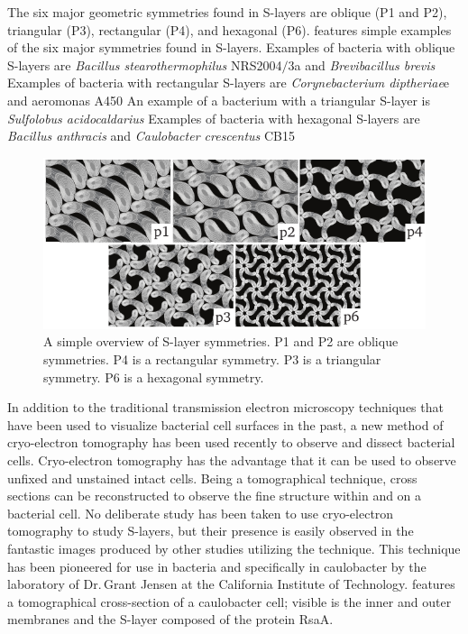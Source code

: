 The six major geometric symmetries found in \acp{S-layer} are oblique (P1 and P2), triangular (P3), rectangular (P4), and hexagonal (P6).  features simple
examples of the six major symmetries found in \acp{S-layer}. Examples of bacteria with oblique \acp{S-layer} are \textit{Bacillus stearothermophilus}
NRS2004$/$3a and \textit{Brevibacillus brevis} Examples of bacteria with rectangular \acp{S-layer} are
\textit{Corynebacterium diptheriae}e and \acl{aeromonas} A450 An example of a bacterium with a triangular \ac{S-layer}
is \textit{Sulfolobus acidocaldarius} Examples of bacteria with hexagonal \acp{S-layer} are \textit{Bacillus anthracis} and
\textit{Caulobacter crescentus} CB15

\begin{figure}[htb] %
  \begin{center}
    \includegraphics[]{intro/img/symmetries.pdf}
  \end{center}
  \caption[A simple overview of \ac{S-layer} symmetries]{A simple overview of \ac{S-layer} symmetries. P1 and P2 are oblique symmetries. P4 is a rectangular symmetry. P3 is a
triangular symmetry. P6 is a hexagonal symmetry.}
  \label{fig:symmetries}
\end{figure}
   
In addition to the traditional transmission electron microscopy techniques that have been used to visualize bacterial cell surfaces in the past, a new method of cryo-electron
tomography has been used recently to observe and dissect bacterial cells. Cryo-electron tomography has the advantage that it can be used to observe unfixed and unstained intact
cells. Being a tomographical technique, cross sections can be reconstructed to observe the fine structure within and on a bacterial cell. No deliberate study has been taken to use
cryo-electron tomography to study \acp{S-layer}, but their presence is easily observed in the fantastic images produced by other studies utilizing the technique. This technique has
been pioneered for use in bacteria and specifically in \acl{caulobacter} by the laboratory of Dr.\,Grant Jensen at the California Institute of Technology. 
features a tomographical cross-section of a \ac{caulobacter} cell; visible is the inner and outer membranes and the \ac{S-layer} composed of the protein RsaA.

